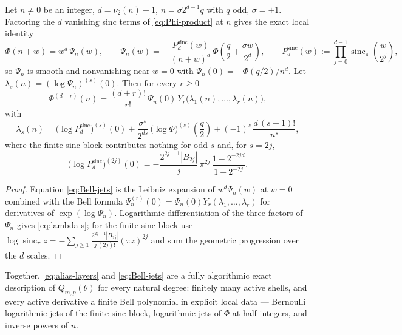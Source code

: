 \documentclass[11pt,oneside]{article}
\numberwithin{equation}{section}
\theoremstyle{definition}
\theoremstyle{remark}
\newcommand{\sincpi}{\operatorname{sinc}_{\pi}}
\newcommand{\vtwo}{\nu_2}
\newcommand{\abs}[1]{\left\lvert #1\right\rvert}
\newcommand{\Bell}{Y}
\begin{document}
\begin{proposition}
\label{prop:Bell-jets}
Let $n\ne0$ be an integer, $d=\vtwo(n)+1$, $n=\sigma2^{d-1}q$ with $q$
odd, $\sigma=\pm1$.  Factoring the $d$ vanishing sinc terms of
\eqref{eq:Phi-product} at $n$ gives the exact local identity
\begin{equation}
 \Phi(n+w)=w^{d}\,\Psi_n(w),
 \qquad
 \Psi_n(w)
 =-\,\frac{P^{\mathrm{sinc}}_d(w)}{(n+w)^{d}}\,
 \Phi\!\left(\frac q2+\frac{\sigma w}{2^{d}}\right),
 \qquad
 P^{\mathrm{sinc}}_d(w):=\prod_{j=0}^{d-1}\sincpi\!\left(\frac{w}{2^{j}}\right),
 \label{eq:local-factorization}
\end{equation}
so $\Psi_n$ is smooth and nonvanishing near $w=0$ with
$\Psi_n(0)=-\Phi(q/2)/n^{d}$.  Let
$\lambda_s(n)=(\log\Psi_n)^{(s)}(0)$.  Then for every $r\ge0$
\begin{equation}
 \Phi^{(d+r)}(n)
 =\frac{(d+r)!}{r!}\,\Psi_n(0)\,
 \Bell_r\bigl(\lambda_1(n),\dots,\lambda_r(n)\bigr),
 \label{eq:Bell-jets}
\end{equation}
with
\begin{equation}
 \lambda_s(n)
 =\bigl(\log P^{\mathrm{sinc}}_d\bigr)^{(s)}(0)
 +\frac{\sigma^{s}}{2^{ds}}\,
 \bigl(\log\Phi\bigr)^{(s)}\!\left(\frac q2\right)
 +(-1)^{s}\,\frac{d\,(s-1)!}{n^{s}},
 \label{eq:lambda-s}
\end{equation}
where the finite sinc block contributes nothing for odd $s$ and, for
$s=2j$,
\begin{equation}
 \bigl(\log P^{\mathrm{sinc}}_d\bigr)^{(2j)}(0)
 =-\frac{2^{2j-1}\abs{B_{2j}}}{j}\,\pi^{2j}\,
 \frac{1-2^{-2jd}}{1-2^{-2j}}.
 \label{eq:Bernoulli-log-jet}
\end{equation}
\end{proposition}

\begin{proof}
Equation \eqref{eq:Bell-jets} is the Leibniz expansion of
$w^{d}\Psi_n(w)$ at $w=0$ combined with the Bell formula
$\Psi_n^{(r)}(0)=\Psi_n(0)\Bell_r(\lambda_1,\dots,\lambda_r)$ for
derivatives of $\exp(\log\Psi_n)$.  Logarithmic differentiation of the
three factors of $\Psi_n$ gives \eqref{eq:lambda-s}; for the finite
sinc block use
$\log\sincpi z=-\sum_{j\ge1}
\frac{2^{2j-1}\abs{B_{2j}}}{j\,(2j)!}(\pi z)^{2j}$
and sum the geometric progression over the $d$ scales.
\end{proof}

Together, \eqref{eq:alias-layers} and \eqref{eq:Bell-jets} are a fully
algorithmic exact description of $Q_{m,p}(\theta)$ for every natural
degree: finitely many active shells, and every active derivative a
finite Bell polynomial in explicit local data ---
Bernoulli logarithmic jets of the finite sinc block, logarithmic jets
of $\Phi$ at half-integers, and inverse powers of $n$.
\end{document}
